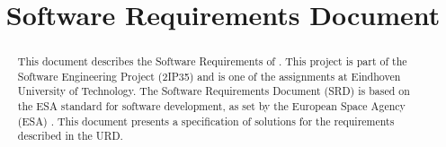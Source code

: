 

\title{Software Requirements Document}

\newcommand{\TitleFull}{Software Requirements Document}
\renewcommand{\TitelAbbr}{SRD}
\renewcommand{\Version}{0.0}




\begin{abstract}

This document describes the Software Requirements of \projectname. This project is part of the Software Engineering Project (2IP35) and is one of the assignments at Eindhoven University of Technology. The Software Requirements Document (SRD) is based on the ESA standard for software development, as set by the European Space Agency (ESA) \cite{esa}. This document presents a specification of solutions for the requirements described in the URD.
\end{abstract}

\tableofcontents














